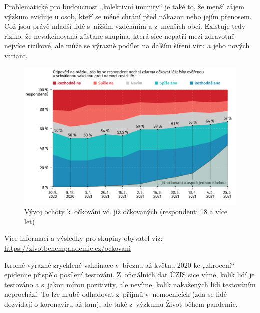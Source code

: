 Problematické pro budoucnost „kolektivní imunity“ je také to, že menší zájem výzkum eviduje u osob, kteří se méně chrání před nákazou nebo jejím přenosem. Což jsou právě mladší lidé s nižším vzděláním a z menších obcí. Existuje tedy riziko, že nevakcinovaná zůstane skupina, která sice nepatří mezi zdravotně nejvíce rizikové, ale může se výrazně podílet na dalším šíření viru a jeho nových variant.

\begin{figure}[ht]
    \centering
    \includegraphics[width=\textwidth]{./pic/zbp-graf6.png}
    \caption{Vývoj ochoty k očkování vč. již očkovaných (respondenti 18 a více let)}
    \label{fig:zbp6}
\end{figure}

Více informací a výsledky pro skupiny obyvatel viz: \url{https://zivotbehempandemie.cz/ockovani}

Kromě výrazně zrychlené vakcinace v březnu až květnu 2020 ke „zkrocení“ epidemie přispělo posílení testování. Z oficiálních dat ÚZIS sice víme, kolik lidí je testováno a s jakou mírou pozitivity, ale nevíme, kolik nakažených lidí testováním neprochází. To lze hrubě odhadovat z příjmů v nemocnicích (zda se lidé dozvídají o koronaviru až tam), ale také z výzkumu Život během pandemie. 


